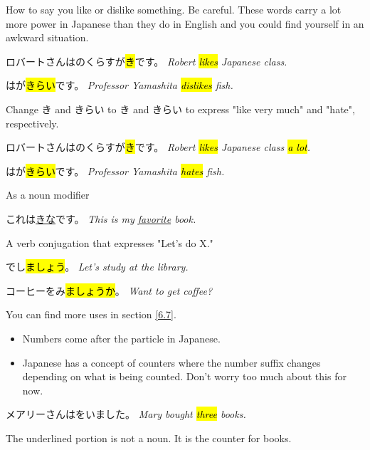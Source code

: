     {
    How to say you like or dislike something. Be careful. These words carry a lot more power in Japanese than they do in English and you could find yourself in an awkward situation.

    ロバートさんはのくらすが\hl{き}です。
    \textit{Robert \hl{likes} Japanese class.}

    はが\hl{きらい}です。
    \textit{Professor Yamashita \hl{dislikes} fish.}

    Change き and きらい to き and きらい to express "like very much" and "hate", respectively.

    ロバートさんはのくらすが\hl{き}です。
    \textit{Robert \hl{likes} Japanese class \hl{a lot}.}

    はが\hl{きらい}です。
    \textit{Professor Yamashita \hl{hates} fish.}

    As a noun modifier

    これは\underline{きな}です。
    \textit{This is my \underline{favorite} book.}
    }

    {
    A verb conjugation that expresses "Let's do X."

   でし\hl{ましょう}。 
   \textit{Let's study at the library.}

    コーヒーをみ\hl{ましょうか}。
    \textit{Want to get coffee?}
    
    You can find more uses in section \ref{6.7}.
    }

    {
    \begin{itemize}
        \item Numbers come after the particle in Japanese.
        \item Japanese has a concept of counters where the number suffix changes depending on what is being counted. Don't worry too much about this for now. 
    \end{itemize}

    メアリーさんはをいました。
    \textit{Mary bought \hl{three} books.}

    The underlined portion is not a noun. It is the counter for books.
    }